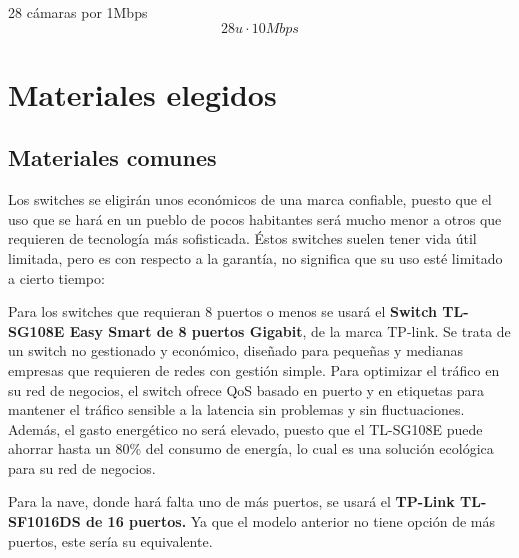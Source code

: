 \documentclass{article}
\begin{document}
28 cámaras por 1Mbps
$$28u \cdot 10Mbps$$

\section{Materiales elegidos}

\subsection{Materiales comunes}
Los switches se eligirán unos económicos de una marca confiable, puesto que el uso que se hará en un pueblo de pocos habitantes será mucho menor a otros que requieren de tecnología más sofisticada. Éstos switches suelen tener vida útil limitada, pero es con respecto a la garantía, no significa que su uso esté limitado a cierto tiempo:

\quad

Para los switches que requieran 8 puertos o menos se usará el \textbf{Switch TL-SG108E Easy Smart de 8 puertos Gigabit}, de la marca TP-link. Se trata de un switch no gestionado y económico, diseñado para pequeñas y medianas empresas que requieren de redes con gestión simple. Para optimizar el tráfico en su red de negocios, el switch ofrece QoS basado en puerto y en etiquetas para mantener el tráfico sensible a la latencia sin problemas y sin fluctuaciones. Además, el gasto energético no será elevado, puesto que el TL-SG108E puede ahorrar hasta un 80\% del consumo de energía, lo cual es una solución ecológica para su red de negocios. 

Para la nave, donde hará falta uno de más puertos, se usará el \textbf{TP-Link TL-SF1016DS de 16 puertos.} Ya que el modelo anterior no tiene opción de más puertos, este sería su equivalente. 
\end{document}
